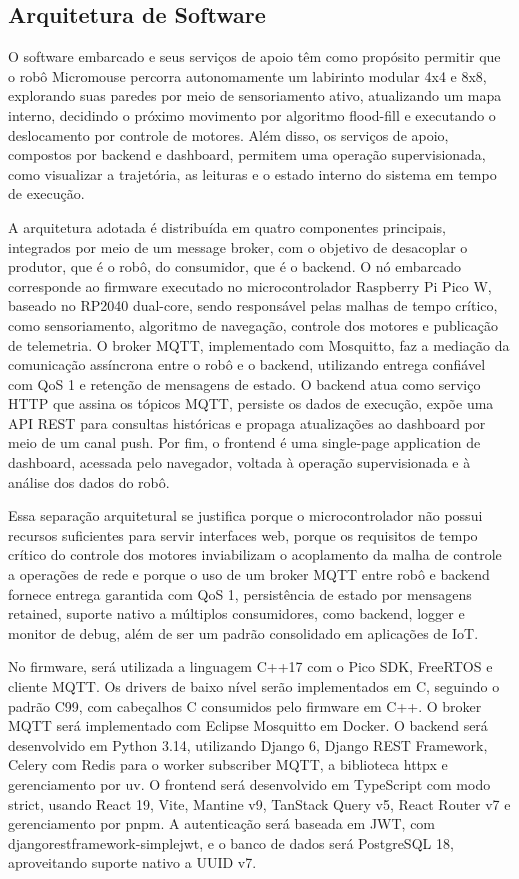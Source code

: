     \subsection{Arquitetura de Software}

    O software embarcado e seus serviços de apoio têm como propósito permitir que o robô Micromouse percorra autonomamente um labirinto modular 4x4 e 8x8, explorando suas paredes por meio de sensoriamento ativo, atualizando um mapa interno, decidindo o próximo movimento por algoritmo flood-fill e executando o deslocamento por controle de motores. Além disso, os serviços de apoio, compostos por backend e dashboard, permitem uma operação supervisionada, como visualizar a trajetória, as leituras e o estado interno do sistema em tempo de execução.

    A arquitetura adotada é distribuída em quatro componentes principais, integrados por meio de um message broker, com o objetivo de desacoplar o produtor, que é o robô, do consumidor, que é o backend. O nó embarcado corresponde ao firmware executado no microcontrolador Raspberry Pi Pico W, baseado no RP2040 dual-core, sendo responsável pelas malhas de tempo crítico, como sensoriamento, algoritmo de navegação, controle dos motores e publicação de telemetria. O broker MQTT, implementado com Mosquitto, faz a mediação da comunicação assíncrona entre o robô e o backend, utilizando entrega confiável com QoS 1 e retenção de mensagens de estado. O backend atua como serviço HTTP que assina os tópicos MQTT, persiste os dados de execução, expõe uma API REST para consultas históricas e propaga atualizações ao dashboard por meio de um canal push. Por fim, o frontend é uma single-page application de dashboard, acessada pelo navegador, voltada à operação supervisionada e à análise dos dados do robô.

    Essa separação arquitetural se justifica porque o microcontrolador não possui recursos suficientes para servir interfaces web, porque os requisitos de tempo crítico do controle dos motores inviabilizam o acoplamento da malha de controle a operações de rede e porque o uso de um broker MQTT entre robô e backend fornece entrega garantida com QoS 1, persistência de estado por mensagens retained, suporte nativo a múltiplos consumidores, como backend, logger e monitor de debug, além de ser um padrão consolidado em aplicações de IoT.

    No firmware, será utilizada a linguagem C++17 com o Pico SDK, FreeRTOS e cliente MQTT. Os drivers de baixo nível serão implementados em C, seguindo o padrão C99, com cabeçalhos C consumidos pelo firmware em C++. O broker MQTT será implementado com Eclipse Mosquitto em Docker. O backend será desenvolvido em Python 3.14, utilizando Django 6, Django REST Framework, Celery com Redis para o worker subscriber MQTT, a biblioteca httpx e gerenciamento por uv. O frontend será desenvolvido em TypeScript com modo strict, usando React 19, Vite, Mantine v9, TanStack Query v5, React Router v7 e gerenciamento por pnpm. A autenticação será baseada em JWT, com djangorestframework-simplejwt, e o banco de dados será PostgreSQL 18, aproveitando suporte nativo a UUID v7.

